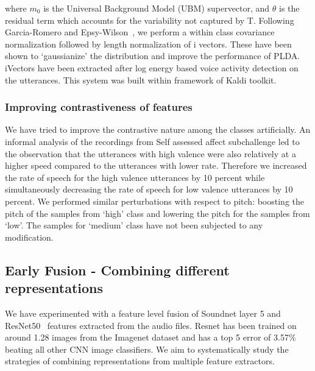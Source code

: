 \noindent where $m_0$ is the Universal Background Model (UBM) supervector, and $\theta$ is the residual term which accounts for the variability not captured by T. Following Garcia-Romero and Epsy-Wilson~\cite{garcia2011analysis}, we perform a within class covariance normalization followed by length normalization of i vectors. These have been shown to `gaussianize' the distribution and improve the performance of PLDA. iVectors have been extracted after log energy based voice activity detection on the utterances. This system was built within framework of Kaldi toolkit\cite{kaldi2011}.

\subsubsection{Improving contrastiveness of features}
\label{subsec:emphasis}
We have tried to improve the contrastive nature among the classes artificially. An informal analysis of the recordings from Self assessed affect subchallenge led to the observation that the utterances with high valence were also relatively at a higher speed compared to the utterances with lower rate. Therefore we increased the rate of speech for the high valence utterances by 10 percent while simultaneously decreasing the rate of speech for low valence utterances by 10 percent. We performed similar perturbations with respect to pitch: boosting the pitch of the samples from `high' class and lowering the pitch for the samples from `low'. The samples for `medium' class have not been subjected to any modification. 

\subsection{Early Fusion - Combining different representations}

We have experimented with a feature level fusion of Soundnet layer 5 and ResNet50~\cite{Resnet2015} features extracted from the audio files. Resnet has been trained on around 1.28 images from the Imagenet dataset and has a top 5 error of 3.57\% beating all other CNN image classifiers.  We aim to systematically study the strategies of combining representations from multiple feature extractors. 

\begin{comment}
\subsubsection{Normalizing length of audio files}
The audio files in the Atypical Affect Assessment  have variational lengths. To bring all audio files to the same scale of duration, we clip all the audio files to a maximum of 3s which is the average length of duration of all audio files. Though this leads to some information loss, it could probably help in enhancing the presence of weaker class files. \end{comment}



